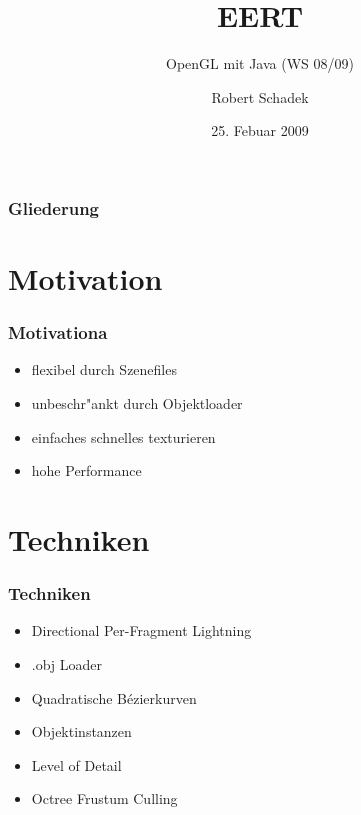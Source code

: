 \documentclass[notes]{beamer} %
\title{EERT}
\subtitle{OpenGL mit Java (WS 08/09)}
\author{ Robert Schadek}
\date{25. Febuar 2009}
\begin{document}
\maketitle
\begin{frame}
\begin{spacing}{1}
\frametitle{Gliederung}
\tableofcontents[hidesubsections]
\end{spacing}
\end{frame}
\section{Motivation}
\begin{frame}
\begin{spacing}{1}
\frametitle{Motivationa}
\begin{itemize}
\item flexibel durch Szenefiles
\item unbeschr"ankt durch Objektloader
\item einfaches schnelles texturieren
\item hohe Performance
\end{itemize}
\end{spacing}
\end{frame}
\section{Techniken}
\begin{frame}
\begin{spacing}{1}
\frametitle{Techniken}
\begin{itemize}
\item Directional Per-Fragment Lightning
\item .obj Loader
\item Quadratische B\'{e}zierkurven
\item Objektinstanzen
\item Level of Detail
\item Octree Frustum Culling
\end{itemize}
\end{spacing}
\end{frame}
\end{document}
